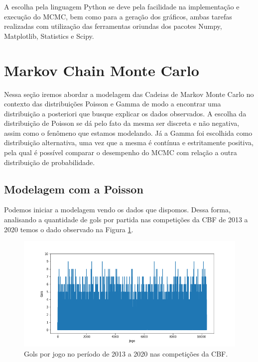 \documentclass[11pt,letterpaper,twocolumn]{article}
\begin{document}
A escolha pela linguagem Python se deve pela facilidade na implementação e execução do MCMC, bem como para a geração dos gráficos, ambas tarefas realizadas com utilização das ferramentas oriundas dos pacotes {\selectfont Numpy}, {\selectfont Matplotlib}, {\selectfont Statistics} e {\selectfont Scipy}.

\section{Markov Chain Monte Carlo}

Nessa seção iremos abordar a modelagem das Cadeias de Markov Monte Carlo no contexto das distribuições Poisson e Gamma de modo a encontrar uma distribuição a posteriori que busque explicar os dados observados. A escolha da distribuição de Poisson se dá pelo fato da mesma ser discreta e não negativa, assim como o fenômeno que estamos modelando. Já a Gamma foi escolhida como distribuição alternativa, uma vez que a mesma é contínua e estritamente positiva, pela qual é possível comparar o desempenho do MCMC com relação a outra distribuição de probabilidade. 

\subsection{Modelagem com a Poisson}
\label{poisson}
\justify

Podemos iniciar a modelagem vendo os dados que dispomos. Dessa forma, analisando a quantidade de gols por partida nas competições da CBF de 2013 a 2020 temos o dado observado na Figura \ref{fig01p}.
\begin{figure}[hbt]
    \centering
    \includegraphics[scale = 0.40, center]{Poisson/fig01 - poisson.png}
    \caption{Gols por jogo no período de 2013 a 2020 nas competições da CBF.}
    \label{fig01p}
\end{figure}
\end{document}
